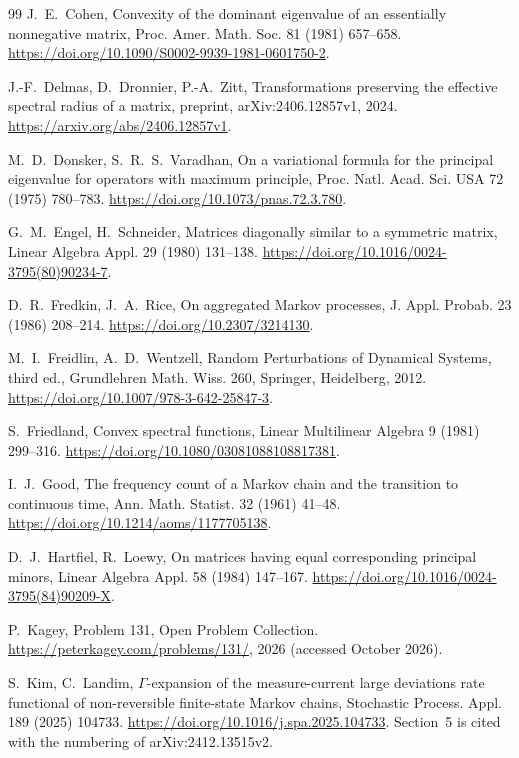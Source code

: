 \begin{thebibliography}{99}
J.~E.~Cohen, Convexity of the dominant eigenvalue of an essentially nonnegative matrix, Proc.
Amer. Math. Soc. 81 (1981) 657--658. \url{https://doi.org/10.1090/S0002-9939-1981-0601750-2}.

J.-F.~Delmas, D.~Dronnier, P.-A.~Zitt, Transformations preserving the effective spectral radius
of a matrix, preprint, arXiv:2406.12857v1, 2024. \url{https://arxiv.org/abs/2406.12857v1}.

M.~D.~Donsker, S.~R.~S.~Varadhan, On a variational formula for the principal eigenvalue for
operators with maximum principle, Proc. Natl. Acad. Sci. USA 72 (1975) 780--783.
\url{https://doi.org/10.1073/pnas.72.3.780}.

G.~M.~Engel, H.~Schneider, Matrices diagonally similar to a symmetric matrix, Linear Algebra
Appl. 29 (1980) 131--138. \url{https://doi.org/10.1016/0024-3795(80)90234-7}.

D.~R.~Fredkin, J.~A.~Rice, On aggregated Markov processes, J. Appl. Probab. 23 (1986) 208--214.
\url{https://doi.org/10.2307/3214130}.

M.~I.~Freidlin, A.~D.~Wentzell, Random Perturbations of Dynamical Systems, third ed.,
Grundlehren Math. Wiss. 260, Springer, Heidelberg, 2012.
\url{https://doi.org/10.1007/978-3-642-25847-3}.

S.~Friedland, Convex spectral functions, Linear Multilinear Algebra 9 (1981) 299--316.
\url{https://doi.org/10.1080/03081088108817381}.

I.~J.~Good, The frequency count of a Markov chain and the transition to continuous time, Ann.
Math. Statist. 32 (1961) 41--48. \url{https://doi.org/10.1214/aoms/1177705138}.

D.~J.~Hartfiel, R.~Loewy, On matrices having equal corresponding principal minors, Linear
Algebra Appl. 58 (1984) 147--167. \url{https://doi.org/10.1016/0024-3795(84)90209-X}.

P.~Kagey, Problem 131, Open Problem Collection. \url{https://peterkagey.com/problems/131/},
2026 (accessed October 2026).

S.~Kim, C.~Landim, $\Gamma$-expansion of the measure-current large deviations rate functional of
non-reversible finite-state Markov chains, Stochastic Process. Appl. 189 (2025) 104733.
\url{https://doi.org/10.1016/j.spa.2025.104733}. Section~5 is cited with the numbering of
arXiv:2412.13515v2.


\end{thebibliography}
